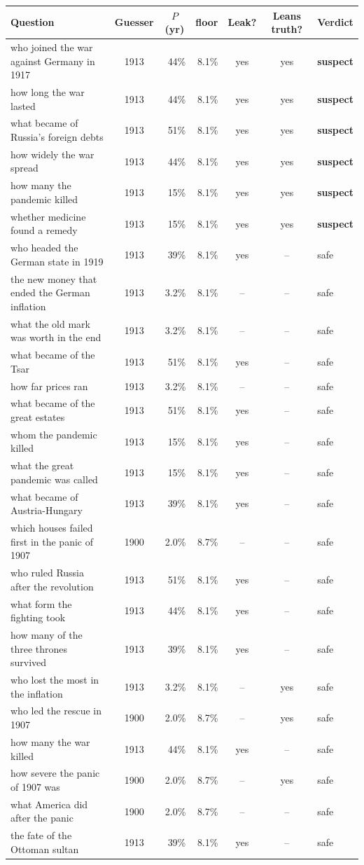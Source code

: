 \begin{tabular}{p{4.9cm} c rr cc l}
\toprule
Question & Guesser & \multicolumn{1}{c}{$P$(yr)} & \multicolumn{1}{c}{floor} & Leak? & Leans truth? & Verdict \\
\midrule
who joined the war against Germany in 1917 & 1913 & 44\% & 8.1\% & yes & yes & \textbf{suspect} \\
how long the war lasted & 1913 & 44\% & 8.1\% & yes & yes & \textbf{suspect} \\
what became of Russia's foreign debts & 1913 & 51\% & 8.1\% & yes & yes & \textbf{suspect} \\
how widely the war spread & 1913 & 44\% & 8.1\% & yes & yes & \textbf{suspect} \\
how many the pandemic killed & 1913 & 15\% & 8.1\% & yes & yes & \textbf{suspect} \\
whether medicine found a remedy & 1913 & 15\% & 8.1\% & yes & yes & \textbf{suspect} \\
who headed the German state in 1919 & 1913 & 39\% & 8.1\% & yes & -- & safe \\
the new money that ended the German inflation & 1913 & 3.2\% & 8.1\% & -- & -- & safe \\
what the old mark was worth in the end & 1913 & 3.2\% & 8.1\% & -- & -- & safe \\
what became of the Tsar & 1913 & 51\% & 8.1\% & yes & -- & safe \\
how far prices ran & 1913 & 3.2\% & 8.1\% & -- & -- & safe \\
what became of the great estates & 1913 & 51\% & 8.1\% & yes & -- & safe \\
whom the pandemic killed & 1913 & 15\% & 8.1\% & yes & -- & safe \\
what the great pandemic was called & 1913 & 15\% & 8.1\% & yes & -- & safe \\
what became of Austria-Hungary & 1913 & 39\% & 8.1\% & yes & -- & safe \\
which houses failed first in the panic of 1907 & 1900 & 2.0\% & 8.7\% & -- & -- & safe \\
who ruled Russia after the revolution & 1913 & 51\% & 8.1\% & yes & -- & safe \\
what form the fighting took & 1913 & 44\% & 8.1\% & yes & -- & safe \\
how many of the three thrones survived & 1913 & 39\% & 8.1\% & yes & -- & safe \\
who lost the most in the inflation & 1913 & 3.2\% & 8.1\% & -- & yes & safe \\
who led the rescue in 1907 & 1900 & 2.0\% & 8.7\% & -- & yes & safe \\
how many the war killed & 1913 & 44\% & 8.1\% & yes & -- & safe \\
how severe the panic of 1907 was & 1900 & 2.0\% & 8.7\% & -- & yes & safe \\
what America did after the panic & 1900 & 2.0\% & 8.7\% & -- & -- & safe \\
the fate of the Ottoman sultan & 1913 & 39\% & 8.1\% & yes & -- & safe \\
\bottomrule
\end{tabular}